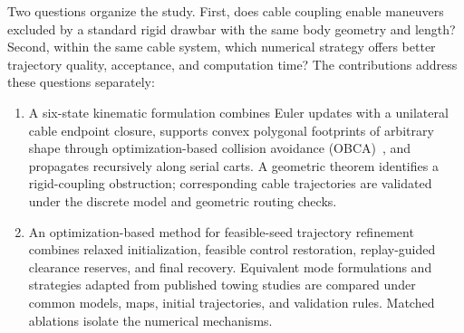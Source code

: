 Two questions organize the study. First, does cable coupling enable maneuvers excluded by a standard rigid drawbar with the same body geometry and length? Second, within the same cable system, which numerical strategy offers better trajectory quality, acceptance, and computation time? The contributions address these questions separately:
\begin{enumerate}
\item A six-state kinematic formulation combines Euler updates with a unilateral cable endpoint closure, supports convex polygonal footprints of arbitrary shape through optimization-based collision avoidance (OBCA)~\cite{obca2021}, and propagates recursively along serial carts. A geometric theorem identifies a rigid-coupling obstruction; corresponding cable trajectories are validated under the discrete model and geometric routing checks.
\item An optimization-based method for feasible-seed trajectory refinement combines relaxed initialization, feasible control restoration, replay-guided clearance reserves, and final recovery. Equivalent mode formulations and strategies adapted from published towing studies are compared under common models, maps, initial trajectories, and validation rules. Matched ablations isolate the numerical mechanisms.
\end{enumerate}
